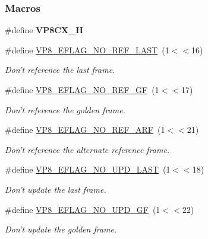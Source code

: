 \subsubsection*{Macros}
\begin{DoxyCompactItemize}
\item 
\hypertarget{group__vp8__encoder_gae0ac779c2d78f39ad22df9f9f246d1fa}{\#define {\bfseries V\-P8\-C\-X\-\_\-\-H}}\label{group__vp8__encoder_gae0ac779c2d78f39ad22df9f9f246d1fa}

\item 
\#define \hyperlink{group__vp8__encoder_gafb51c67e5743275146bc1fc425727da3}{V\-P8\-\_\-\-E\-F\-L\-A\-G\-\_\-\-N\-O\-\_\-\-R\-E\-F\-\_\-\-L\-A\-S\-T}~(1$<$$<$16)
\begin{DoxyCompactList}\small\item\em Don't reference the last frame. \end{DoxyCompactList}\item 
\#define \hyperlink{group__vp8__encoder_gabb5e95343a2738abef44eca13059da33}{V\-P8\-\_\-\-E\-F\-L\-A\-G\-\_\-\-N\-O\-\_\-\-R\-E\-F\-\_\-\-G\-F}~(1$<$$<$17)
\begin{DoxyCompactList}\small\item\em Don't reference the golden frame. \end{DoxyCompactList}\item 
\#define \hyperlink{group__vp8__encoder_ga650ab0baea12be91082226a5cc18776a}{V\-P8\-\_\-\-E\-F\-L\-A\-G\-\_\-\-N\-O\-\_\-\-R\-E\-F\-\_\-\-A\-R\-F}~(1$<$$<$21)
\begin{DoxyCompactList}\small\item\em Don't reference the alternate reference frame. \end{DoxyCompactList}\item 
\#define \hyperlink{group__vp8__encoder_ga602edb6b02a89cb2db7a16d6dffba583}{V\-P8\-\_\-\-E\-F\-L\-A\-G\-\_\-\-N\-O\-\_\-\-U\-P\-D\-\_\-\-L\-A\-S\-T}~(1$<$$<$18)
\begin{DoxyCompactList}\small\item\em Don't update the last frame. \end{DoxyCompactList}\item 
\#define \hyperlink{group__vp8__encoder_gab01d066c5236457d345ce1cab4c41d6b}{V\-P8\-\_\-\-E\-F\-L\-A\-G\-\_\-\-N\-O\-\_\-\-U\-P\-D\-\_\-\-G\-F}~(1$<$$<$22)
\begin{DoxyCompactList}\small\item\em Don't update the golden frame. \end{DoxyCompactList}\item 
$$
\end{DoxyCompactItemize}
